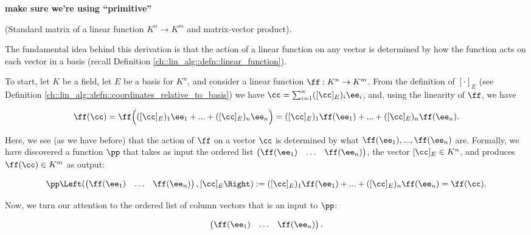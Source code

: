 \textbf{make sure we're using ``primitive''}

\begin{deriv}
\label{ch::lin_alg::deriv::primitive_matrix}
    (Standard matrix of a linear function $K^n \rightarrow K^m$ and matrix-vector product). 
    
    The fundamental idea behind this derivation is that the action of a linear function on any vector is determined by how the function acts on each vector in a basis (recall Definition \ref{ch::lin_alg::defn::linear_function}).
    
    To start, let $K$ be a field, let $E$ be a basis for $K^n$, and consider a linear function $\ff:K^n \rightarrow K^m$. From the definition of $[\cdot]_E$ (see Definition \ref{ch::lin_alg::defn::coordinates_relative_to_basis}) we have $\cc = \sum_{i = 1}^n ([\cc]_E)_i \ee_i$, and, using the linearity of $\ff$, we have
    
    \begin{align*}
        \ff(\cc) = \ff \Big( ([\cc]_E)_1 \ee_1 + ... + ([\cc]_E)_n \ee_n \Big) = ([\cc]_E)_1 \ff(\ee_1) + ... + ([\cc]_E)_n \ff(\ee_n).
    \end{align*}
    
    Here, we see (as we have before) that the action of $\ff$ on a vector $\cc$ is determined by what $\ff(\ee_1), ..., \ff(\ee_n)$ are. Formally, we have discovered a function $\pp$ that takes as input the ordered list $\begin{pmatrix} \ff(\ee_1) & \hdots & \ff(\ee_n) \end{pmatrix}$, the vector $[\cc]_E \in K^n$, and produces $\ff(\cc) \in K^m$ as output:
    
    \begin{align*}
        \pp\Left( \begin{pmatrix} \ff(\ee_1) & \hdots & \ff(\ee_n) \end{pmatrix}, [\cc]_E \Right) := ([\cc]_E)_1 \ff(\ee_1) + ... + ([\cc]_E)_n \ff(\ee_n) = \ff(\cc).
    \end{align*}
    
    Now, we turn our attention to the ordered list of column vectors that is an input to $\pp$:
    
    \begin{align*}
        \begin{pmatrix} 
            \ff(\ee_1) & \hdots & \ff(\ee_n)
        \end{pmatrix}.
    \end{align*}
    

\end{deriv}
